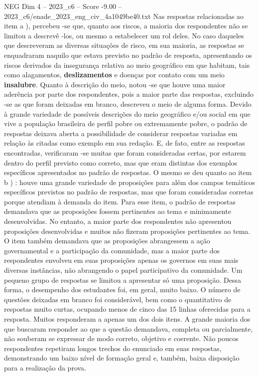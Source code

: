 \begin{textsample}{NEG Dim 4 – 2023\_c6 – Score -9.00 – 2023\_c6/enade\_2023\_eng\_civ\_4a1049be40.txt}
Nas respostas relacionadas ao item a ), percebeu -se que, quanto aos riscos, a maioria dos respondentes não se limitou a descrevê -los, ou mesmo a estabelecer um rol deles.
No caso daqueles que descreveram as diversas situações de risco, em sua maioria, as respostas se enquadraram naquilo que estava previsto no padrão de resposta, apresentando os riscos derivados da insegurança relativa ao meio geográfico em que habitam, tais como alagamentos, \textbf{deslizamentos} e doenças por contato com um meio \textbf{insalubre}.
Quanto à descrição do meio, notou -se que houve uma maior aderência por parte dos respondentes, pois a maior parte das respostas, excluindo -se as que foram deixadas em branco, descreveu o meio de alguma forma.
Devido à grande variedade de possíveis descrições do meio geográfico e/ou social em que vive a população brasileira de perfil pobre ou extremamente pobre, o padrão de respostas deixava aberta a possibilidade de considerar respostas variadas em relação às citadas como exemplo em sua redação.
E, de fato, entre as respostas encontradas, verificaram -se muitas que foram consideradas certas, por estarem dentro do perfil previsto como correto, mas que eram distintas dos exemplos específicos apresentados no padrão de respostas.
O mesmo se deu quanto ao item b ) : houve uma grande variedade de proposições para além dos campos temáticos específicos previstos no padrão de respostas, mas que foram consideradas corretas porque atendiam à demanda do item.
Para esse item, o padrão de respostas demandava que as proposições fossem pertinentes ao tema e minimamente desenvolvidas.
No entanto, a maior parte dos respondentes não apresentou proposições desenvolvidas e muitos não fizeram proposições pertinentes ao tema.
O item também demandava que as proposições abrangessem a ação governamental e a participação da comunidade, mas a maior parte dos respondentes envolveu em suas proposições apenas os governos em suas mais diversas instâncias, não abrangendo o papel participativo da comunidade.
Um pequeno grupo de respostas se limitou a apresentar só uma proposição.
Dessa forma, o desempenho dos estudantes foi, em geral, muito baixo.
O número de questões deixadas em branco foi considerável, bem como o quantitativo de respostas muito curtas, ocupando menos de cinco das 15 linhas oferecidas para a resposta.
Muitos responderam a apenas um dos dois itens.
A grande maioria dos que buscaram responder ao que a questão demandava, completa ou parcialmente, não souberam se expressar de modo correto, objetivo e coerente.
Não poucos respondentes repetiram longos trechos do enunciado em suas respostas, demonstrando um baixo nível de formação geral e, também, baixa disposição para a realização da prova.

\end{textsample}
